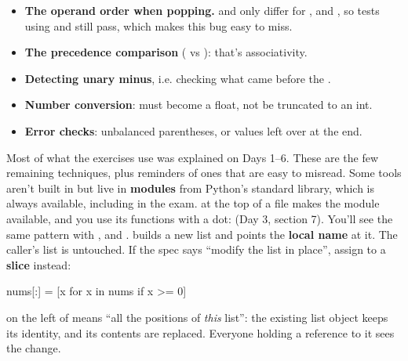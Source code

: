 \documentclass[10pt,a4paper]{article}
\begin{document}
\begin{itemize}
\item \textbf{The operand order when popping.}  and  only differ for \code{-}, \code{/\allowbreak{}} and \code{\textasciicircum{}}, so tests using \code{+} and \code{*} still pass, which makes this bug easy to miss.
\item \textbf{The precedence comparison} (\code{\textgreater{}\allowbreak{}} vs \code{\textgreater{}\allowbreak{}=\allowbreak{}}): that’s associativity.
\item \textbf{Detecting unary minus}, i.e. checking what came before the \code{-}.
\item \textbf{Number conversion}: \code{\textquotedbl{}2.5\textquotedbl{}} must become a float, not be truncated to an int.
\item \textbf{Error checks}: unbalanced parentheses, or values left over at the end.
\end{itemize}
Most of what the exercises use was explained on Days 1–6. These are the few remaining techniques, plus reminders of ones that are easy to misread.
Some tools aren’t built in but live in \textbf{modules} from Python’s standard library, which is always available, including in the exam.  at the top of a file makes the module available, and you use its functions with a dot:  (Day 3, section 7). You’ll see the same pattern with ,  and .
 builds a new list and points the \textbf{local name}  at it. The caller’s list is untouched. If the spec says “modify the list in place”, assign to a \textbf{slice} instead:
\begin{pycode}
nums[:] = [x for x in nums if x >= 0]
\end{pycode}
 on the left of \code{=\allowbreak{}} means “all the positions of \emph{this} list”: the existing list object keeps its identity, and its contents are replaced. Everyone holding a reference to it sees the change.
\end{document}
